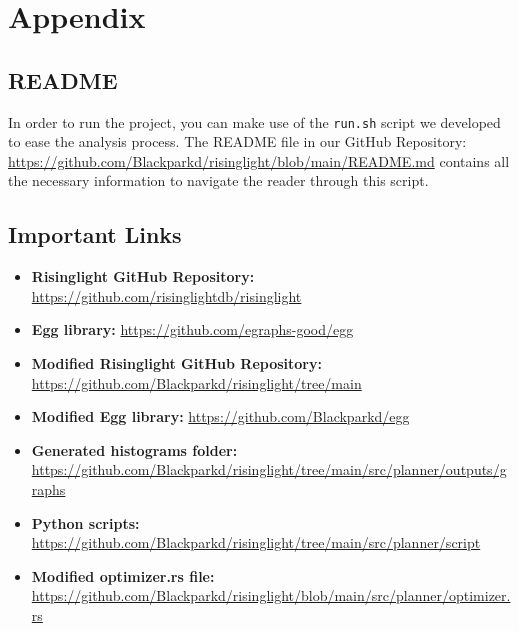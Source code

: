 \documentclass[a4paper,12pt]{scrreprt}
\begin{document}
\appendix

\chapter{Appendix}
\thispagestyle{fancy}

\section{README}

In order to run the project, you can make use of the \texttt{run.sh} script we developed to ease the analysis process. The README file in our GitHub Repository: \url{https://github.com/Blackparkd/risinglight/blob/main/README.md} contains all the necessary information to navigate the reader through this script. \\

\section{Important Links}
\begin{itemize}
    \item \textbf{Risinglight GitHub Repository:} \url{https://github.com/risinglightdb/risinglight}
    \item \textbf{Egg library:} \url{https://github.com/egraphs-good/egg}
    \item \textbf{Modified Risinglight GitHub Repository:} \url{https://github.com/Blackparkd/risinglight/tree/main}
    \item \textbf{Modified Egg library:} \url{https://github.com/Blackparkd/egg}
    \item \textbf{Generated histograms folder:} \url{https://github.com/Blackparkd/risinglight/tree/main/src/planner/outputs/graphs}
    \item \textbf{Python scripts:} \url{https://github.com/Blackparkd/risinglight/tree/main/src/planner/script}
    \item \textbf{Modified optimizer.rs file:} \url{https://github.com/Blackparkd/risinglight/blob/main/src/planner/optimizer.rs}
\end{itemize}
\end{document}
